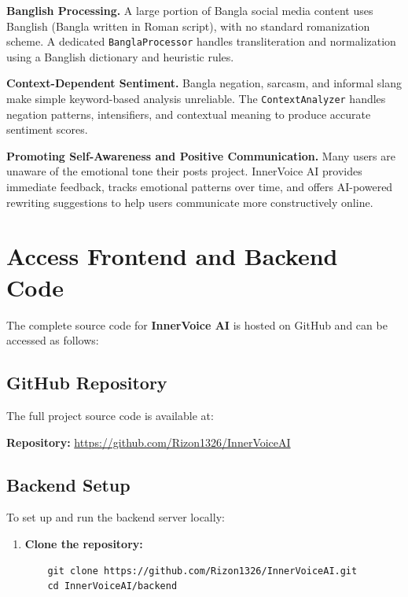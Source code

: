 \documentclass[12pt,a4paper]{report}
\begin{document}
\begin{itemize}
\textbf{Banglish Processing.} A large portion of Bangla social media content uses Banglish (Bangla written in Roman script), with no standard romanization scheme. A dedicated \texttt{BanglaProcessor} handles transliteration and normalization using a Banglish dictionary and heuristic rules.

\textbf{Context-Dependent Sentiment.} Bangla negation, sarcasm, and informal slang make simple keyword-based analysis unreliable. The \texttt{ContextAnalyzer} handles negation patterns, intensifiers, and contextual meaning to produce accurate sentiment scores.

\textbf{Promoting Self-Awareness and Positive Communication.} Many users are unaware of the emotional tone their posts project. InnerVoice AI provides immediate feedback, tracks emotional patterns over time, and offers AI-powered rewriting suggestions to help users communicate more constructively online.

\section{Access Frontend and Backend Code}

The complete source code for \textbf{InnerVoice AI} is hosted on GitHub and can be accessed as follows:

\subsection{GitHub Repository}

The full project source code is available at:

\begin{center}
\textbf{Repository:} \url{https://github.com/Rizon1326/InnerVoiceAI}
\end{center}

\subsection{Backend Setup}

To set up and run the backend server locally:

\begin{enumerate}
    \item \textbf{Clone the repository:}
    \begin{verbatim}
    git clone https://github.com/Rizon1326/InnerVoiceAI.git
    cd InnerVoiceAI/backend
    \end{verbatim}
    

\end{enumerate}
\end{itemize}
\end{document}
